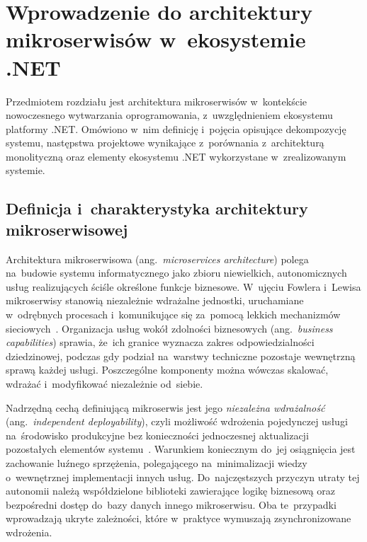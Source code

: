 \cleardoublepage

\chapter{Wprowadzenie do architektury mikroserwisów w~ekosystemie .NET}
\label{cha:WprowadzenieDoMikroserwisow}

Przedmiotem rozdziału jest architektura mikroserwisów
w~kontekście nowoczesnego wytwarzania oprogramowania, z~uwzględnieniem ekosystemu platformy .NET. Omówiono w~nim definicję
i~pojęcia opisujące dekompozycję systemu, następstwa projektowe wynikające
z~porównania z~architekturą monolityczną oraz elementy ekosystemu .NET
wykorzystane w~zrealizowanym systemie.

\section{Definicja i~charakterystyka architektury mikroserwisowej}
\label{sec:DefinicjaMikroserwisow}

Architektura mikroserwisowa (ang.\ \textit{microservices architecture}) polega na~budowie systemu informatycznego jako zbioru niewielkich, autonomicznych usług realizujących ściśle określone funkcje biznesowe. W~ujęciu Fowlera i~Lewisa mikroserwisy stanowią niezależnie wdrażalne jednostki, uruchamiane w~odrębnych procesach i~komunikujące się za~pomocą lekkich mechanizmów sieciowych~\cite{bib:Fowler2014}. Organizacja usług wokół zdolności biznesowych (ang.\ \textit{business capabilities}) sprawia, że~ich granice wyznacza zakres odpowiedzialności dziedzinowej, podczas gdy podział na~warstwy techniczne pozostaje wewnętrzną sprawą każdej usługi. Poszczególne komponenty można wówczas skalować, wdrażać i~modyfikować niezależnie od~siebie.

Nadrzędną cechą definiującą mikroserwis jest jego \textit{niezależna wdrażalność} (ang.\ \textit{independent deployability}), czyli możliwość wdrożenia pojedynczej usługi na~środowisko produkcyjne bez konieczności jednoczesnej aktualizacji pozostałych elementów systemu~\cite{bib:Newman2021}. Warunkiem koniecznym do~jej osiągnięcia jest zachowanie luźnego sprzężenia, polegającego na~minimalizacji wiedzy o~wewnętrznej implementacji innych usług. Do~najczęstszych przyczyn utraty tej autonomii należą współdzielone biblioteki zawierające logikę biznesową oraz bezpośredni dostęp do~bazy danych innego mikroserwisu. Oba te~przypadki wprowadzają ukryte zależności, które w~praktyce wymuszają zsynchronizowane wdrożenia.

